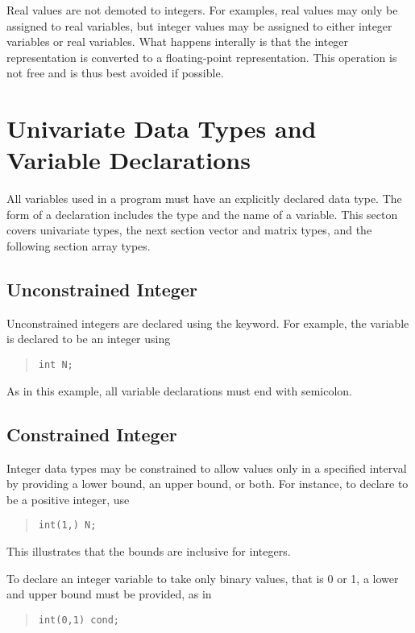 Real values are not demoted to integers.  For examples, real values
may only be assigned to real variables, but integer values may be
assigned to either integer variables or real variables.  What happens
interally is that the integer representation is converted to a
floating-point representation.  This operation is not free and is thus
best avoided if possible.


\section{Univariate Data Types and Variable Declarations}

All variables used in a \Stan program must have an explicitly declared
data type.  The form of a declaration includes the type and the name
of a variable.  This secton covers univariate types, the next section
vector and matrix types, and the following section array types.

\subsection{Unconstrained Integer}

Unconstrained integers are declared using the  keyword.
For example, the variable  is declared to be an integer using
%
\begin{quote}
\begin{Verbatim} 
int N;
\end{Verbatim}
\end{quote}
% 
As in this example, all variable declarations must end with semicolon.

\subsection{Constrained Integer}

Integer data types may be constrained to allow values only in a
specified interval by providing a lower bound, an upper bound, or
both.  For instance, to declare  to be a positive integer, use
%
\begin{quote}
\begin{Verbatim}
int(1,) N;
\end{Verbatim}
\end{quote}
%
This illustrates that the bounds are inclusive for integers.

To declare an integer variable  to take only binary values,
that is 0 or 1, a lower and upper bound must be provided, as in
%
\begin{quote}
\begin{Verbatim} 
int(0,1) cond;
\end{Verbatim}
\end{quote}


